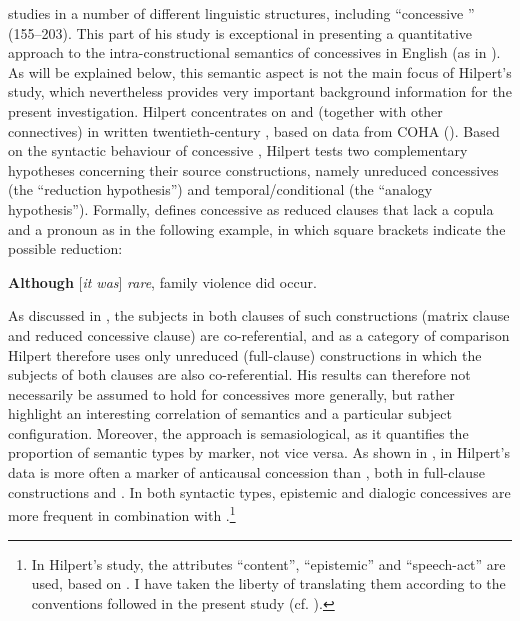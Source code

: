 \begin{sloppypar}
\citet{Hilpert2013a} studies  in a number of different linguistic structures, including “concessive ” (155–203). This part of his study is exceptional in presenting a quantitative approach to the in\-tra-con\-struc\-tional semantics of concessives in English (as in \citealt{Schützler2017,Schützler2018b}). As will be explained below, this semantic aspect is not the main focus of Hilpert's study, which nevertheless provides very important background information for the present investigation. Hilpert concentrates on  and  (together with other connectives) in written twentieth-century , based on data from COHA (\citealt{Davies2010}). Based on the syntactic behaviour of concessive , Hilpert tests two complementary hypotheses concerning their source constructions, namely unreduced concessives (the “reduction hypothesis”) and temporal/conditional  (the “analogy hypothesis”). Formally, \citet[179]{Hilpert2013a} defines concessive  as reduced clauses that lack a copula and a pronoun as in the following example, in which square brackets indicate the possible reduction:
\end{sloppypar}

\ea\label{ex:75} 
\textbf{Although} [\textit{it was}] \textit{rare}, family violence did occur. \citep[179]{Hilpert2013a}
\z

As discussed in , the subjects in both clauses of such constructions (matrix clause and reduced concessive clause) are co-referential, and as a category of comparison Hilpert therefore uses only unreduced (full-clause) constructions in which the subjects of both clauses are also co-referential. His results can therefore not necessarily be assumed to hold for concessives more generally, but rather highlight an interesting correlation of semantics and a particular subject configuration. Moreover, the approach is semasiological, as it quantifies the proportion of semantic types by marker, not vice versa. As shown in , in Hilpert’s data  is more often a marker of anticausal concession than , both in full-clause constructions and . In both syntactic types, epistemic and dialogic concessives are more frequent in combination with .\footnote{In Hilpert’s study, the attributes “content”, “epistemic” and “speech-act” are used, based on \citet{Sweetser1990}. I have taken the liberty of translating them according to the conventions followed in the present study (cf. ).}

